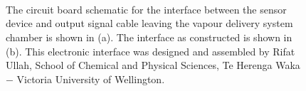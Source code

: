 \documentclass[
  a4paper,
]{scrbook}
\begin{document}
\begin{figure}
\begin{minipage}[t]{0.91\linewidth}
{}

\end{minipage}%
%
\begin{minipage}[t]{0.03\linewidth}

{\centering 

~

}

\end{minipage}%
\newline
\begin{minipage}[t]{0.03\linewidth}

{\centering 


}

\end{minipage}%
%
\begin{minipage}[t]{0.03\linewidth}

{\centering 

~

}

\end{minipage}%
%
\begin{minipage}[t]{0.91\linewidth}

{\centering 


}

\end{minipage}%
%
\begin{minipage}[t]{0.03\linewidth}

{\centering 

~

}

\end{minipage}%

\caption[The circuit board schematic for the interface between the
sensor device and output signal cable leaving the vapour delivery system
chamber, alongside the interface as
constructed.]{\label{fig-device-interface}The circuit board schematic
for the interface between the sensor device and output signal cable
leaving the vapour delivery system chamber is shown in (a). The
interface as constructed is shown in (b). This electronic interface was
designed and assembled by Rifat Ullah, School of Chemical and Physical
Sciences, Te Herenga Waka \(-\) Victoria University of Wellington.}

\end{figure}
\end{document}

